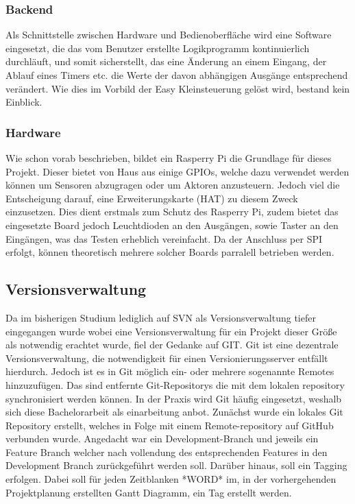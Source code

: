 \subsubsection{Backend} 
Als Schnittstelle zwischen Hardware und Bedienoberfläche wird eine Software eingesetzt, die das vom Benutzer erstellte Logikprogramm kontinuierlich durchläuft, und somit sicherstellt, das eine Änderung an einem Eingang, der Ablauf eines Timers etc. die Werte der davon abhängigen Ausgänge entsprechend verändert. Wie dies im Vorbild der Easy Kleinsteuerung gelöst wird, bestand kein Einblick.  

\subsubsection{Hardware} 
Wie schon vorab beschrieben, bildet ein Rasperry Pi die Grundlage für dieses Projekt. Dieser bietet von Haus aus einige GPIOs, welche  dazu  verwendet werden können um Sensoren abzugragen oder um Aktoren anzusteuern. Jedoch viel die Entscheigung darauf, eine Erweiterungskarte (HAT) zu diesem Zweck einzusetzen. Dies dient erstmals zum Schutz des Rasperry Pi, zudem bietet das eingesetzte Board jedoch Leuchtdioden an den Ausgängen, sowie Taster an den Eingängen, was das Testen erheblich vereinfacht. Da der Anschluss per SPI erfolgt, können theoretisch mehrere solcher Boards parralell betrieben werden. 

\subsection{Versionsverwaltung}
Da im bisherigen Studium lediglich auf SVN als Versionsverwaltung tiefer eingegangen wurde wobei eine Versionsverwaltung für ein Projekt dieser Größe als notwendig erachtet wurde, fiel der Gedanke auf GIT. Git ist eine dezentrale Versionsverwaltung, die notwendigkeit für einen Versionierungsserver entfällt hierdurch. Jedoch ist es in Git möglich ein- oder mehrere sogenannte Remotes hinzuzufügen. Das sind entfernte Git-Repositorys die mit dem lokalen repository synchronisiert werden können. In der Praxis wird Git häufig eingesetzt, weshalb sich diese Bachelorarbeit als einarbeitung anbot. Zunächst wurde ein lokales Git Repository erstellt, welches in Folge mit einem Remote-repository auf GitHub verbunden wurde. Angedacht war ein Development-Branch und jeweils ein Feature Branch welcher nach vollendung des entsprechenden Features in den Development Branch zurückgeführt werden soll. Darüber hinaus, soll ein Tagging erfolgen. Dabei soll für jeden Zeitblanken *WORD* im, in der vorhergehenden Projektplanung erstellten Gantt Diagramm, ein Tag erstellt werden. 


